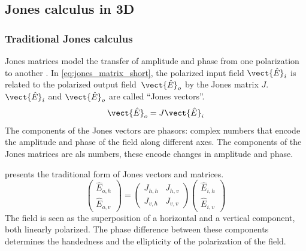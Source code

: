 \subsection{Jones calculus in 3D}

\subsubsection{Traditional Jones calculus}
Jones matrices model the transfer of amplitude and phase from one polarization to another \cite{hecht2002optics}.
In \cref{eq:jones_matrix_short}, the polarized input field $\vect{\hat{E}}_i$ is related to the polarized output field~$\vect{\hat{E}}_o$ by the Jones matrix $J$.
$\vect{\hat{E}}_i$ and $\vect{\hat{E}}_o$ are called ``Jones vectors''.
\begin{equation}
    \vect{\hat{E}}_o = J \vect{\hat{E}}_i
    \label{eq:jones_matrix_short}
\end{equation}
The components of the Jones vectors are phasors: complex numbers that encode the amplitude and phase of the field along different axes.
The components of the Jones matrices are als numbers, these encode changes in amplitude and phase.

 presents the traditional form of Jones vectors and matrices.
\begin{equation}
    \begin{pmatrix}
        \hat{E}_{o, h}\\
        \hat{E}_{o, v}
    \end{pmatrix}
    =
    \begin{pmatrix}
        J_{h, h}   &   J_{h, v} \\
        J_{v, h}   &   J_{v, v}
    \end{pmatrix}
    \begin{pmatrix}
        \hat{E}_{i, h}\\
        \hat{E}_{i, v}
    \end{pmatrix}
    \label{eq:jones_matrix_2d}
\end{equation}
The field is seen as the superposition of a horizontal and a vertical component, both linearly polarized.
The phase difference between these components determines the handedness and the ellipticity of the polarization of the field.

